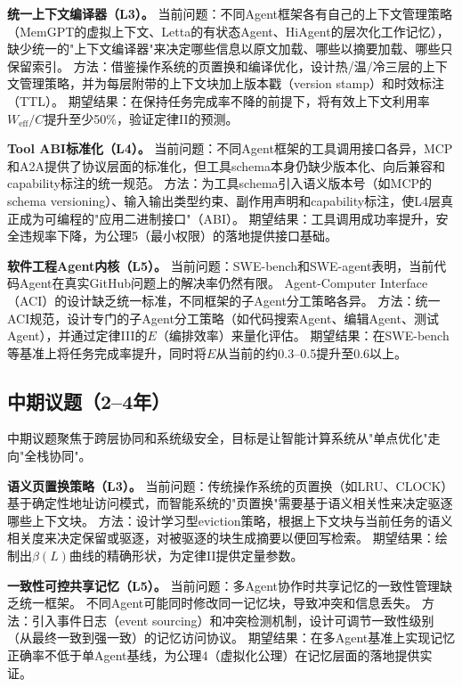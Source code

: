 \textbf{统一上下文编译器（L3）。}
当前问题：不同Agent框架各有自己的上下文管理策略（MemGPT的虚拟上下文、Letta的有状态Agent、HiAgent的层次化工作记忆\cite{memgpt2023,letta_stateful_2026,hiagent2024}），缺少统一的"上下文编译器"来决定哪些信息以原文加载、哪些以摘要加载、哪些只保留索引。
方法：借鉴操作系统的页置换和编译优化，设计热/温/冷三层的上下文管理策略，并为每层附带的上下文块加上版本戳（version stamp）和时效标注（TTL）。
期望结果：在保持任务完成率不降的前提下，将有效上下文利用率$W_{\mathrm{eff}}/C$提升至少50\%，验证定律II的预测。

\textbf{Tool ABI标准化（L4）。}
当前问题：不同Agent框架的工具调用接口各异，MCP和A2A提供了协议层面的标准化，但工具schema本身仍缺少版本化、向后兼容和capability标注的统一规范\cite{mcp_intro_2026,agentprotocols2025}。
方法：为工具schema引入语义版本号（如MCP的schema versioning）、输入输出类型约束、副作用声明和capability标注，使L4层真正成为可编程的"应用二进制接口"（ABI）。
期望结果：工具调用成功率提升，安全违规率下降，为公理5（最小权限）的落地提供接口基础。

\textbf{软件工程Agent内核（L5）。}
当前问题：SWE-bench和SWE-agent表明，当前代码Agent在真实GitHub问题上的解决率仍然有限\cite{swebench2023,sweagent2024}。
Agent-Computer Interface（ACI）的设计缺乏统一标准，不同框架的子Agent分工策略各异。
方法：统一ACI规范，设计专门的子Agent分工策略（如代码搜索Agent、编辑Agent、测试Agent），并通过定律III的$E$（编排效率）来量化评估。
期望结果：在SWE-bench等基准上将任务完成率提升，同时将$E$从当前的约0.3--0.5提升至0.6以上。

\subsection{中期议题（2--4年）}

中期议题聚焦于跨层协同和系统级安全，目标是让智能计算系统从"单点优化"走向"全栈协同"。

\textbf{语义页置换策略（L3）。}
当前问题：传统操作系统的页置换（如LRU、CLOCK）基于确定性地址访问模式，而智能系统的"页置换"需要基于语义相关性来决定驱逐哪些上下文块。
方法：设计学习型eviction策略，根据上下文块与当前任务的语义相关度来决定保留或驱逐，对被驱逐的块生成摘要以便回写检索。
期望结果：绘制出$\beta(L)$曲线的精确形状，为定律II提供定量参数。

\textbf{一致性可控共享记忆（L5）。}
当前问题：多Agent协作时共享记忆的一致性管理缺乏统一框架。
不同Agent可能同时修改同一记忆块，导致冲突和信息丢失。
方法：引入事件日志（event sourcing）和冲突检测机制，设计可调节一致性级别（从最终一致到强一致）的记忆访问协议\cite{raft2014,cap2002}。
期望结果：在多Agent基准上实现记忆正确率不低于单Agent基线，为公理4（虚拟化公理）在记忆层面的落地提供实证。

